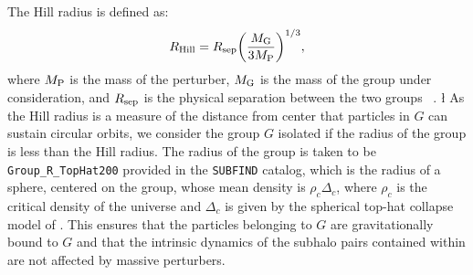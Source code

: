 \documentclass[twocolumn]{aastex63}
\begin{document}
The Hill radius is defined as:
\begin{equation}
  R_{\rm Hill} = R_{\rm sep} \bigg( \frac{ M_{\rm G} }{ 3M_{\rm P} } \bigg)^{1/3},
\end{equation}
where $M_{\rm P}$ is the mass of the perturber, $M_{\rm G}$ is the mass of the group under consideration, and $R_{\rm sep}$ is the physical separation between the two groups ~\citep{hahn09}.
\l
As the Hill radius is a measure of the distance from center that particles in $G$ can sustain circular orbits, we consider the group $G$ isolated if the radius of the group is less than the Hill radius. 
The radius of the group is taken to be \texttt{Group\_R\_TopHat200} provided in the \texttt{SUBFIND} catalog, which is the radius of a sphere, centered on the group, whose mean density is $\rho_c \Delta_c$, where $\rho_c$ is the critical density of the universe and $\Delta_c$ is given by the spherical top-hat collapse model of \citet{brynorman98}. This ensures that the particles belonging to $G$ are gravitationally bound to $G$ and that the intrinsic dynamics of the subhalo pairs contained within are not affected by massive perturbers.

 
\end{document}
